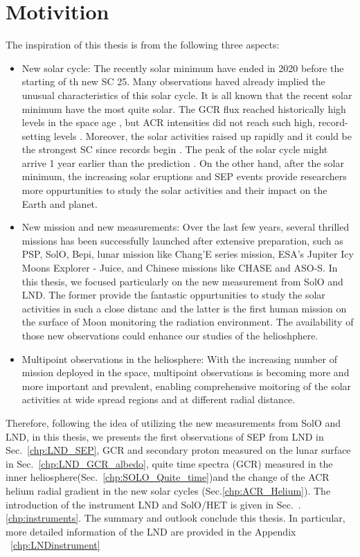 \section{Motivition}

The inspiration of this thesis is from the following three aspects:
\begin{itemize}
	\item New solar cycle: The recently solar minimum have ended in 2020 before the starting of th new \ac{SC} 25. Many observations haved already implied the unusual characteristics of this solar cycle. It is all known that the recent solar minimum have the most quite solar. The \ac{GCR} flux reached historically high levels in the space age \citep{Fu2021ApJS, Xu2022FrASS}, but ACR intensities did not reach such high, record-setting levels \citet{Strauss2023ApJ}. Moreover, the solar activities raised up rapidly and it could be the strongest \ac{SC} since records begin \citet{Nagovitsyn2023SoPh}. The peak of the solar cycle might arrive 1 year earlier than the prediction \citet{McIntosh2020SoPh}. On the other hand, after the solar minimum, the increasing solar eruptions and \ac{SEP} events provide researchers more oppurtunities to study the solar activities and their impact on the Earth and planet.
	\item New mission and new measurements: Over the last few years, several thrilled missions has been successfully launched after extensive preparation, such as \ac{PSP}, \ac{SolO}, \ac{Bepi}, lunar mission like Chang'E series mission, ESA's Jupiter Icy Moons Explorer - Juice, and Chinese missions like CHASE and ASO-S. In this thesis, we focused particularly on the new measurement from \ac{SolO} and \ac{LND}. The former provide the fantastic oppurtunities to study the solar activities in such a close distanc and the latter is the first human mission on the surface of Moon monitoring the radiation environment. The availability of those new observations could enhance our studies of the helioshphere.
	\item Multipoint observations in the heliosphere: With the increasing number of mission deployed in the space, multipoint observations is becoming more and more important and prevalent, enabling comprehensive moitoring of the solar activities at wide spread regions and at different radial distance. 
	
\end{itemize}

Therefore, following the idea of utilizing the new measurements from \ac{SolO} and \ac{LND}, in this thesis, we presents the first  observations of \ac{SEP} from \ac{LND} in Sec.~\ref{chp:LND_SEP}, \ac{GCR} and secondary proton measured on the lunar surface in Sec.~\ref{chp:LND_GCR_albedo}, quite time spectra (\ac{GCR}) measured in the inner heliosphere(Sec.~\ref{chp:SOLO_Quite_time})and the change of the \ac{ACR} helium radial gradient in the new solar cycles (Sec.\ref{chp:ACR_Helium}).
The introduction of the instrument \ac{LND} and \ac{SolO}/\ac{HET} is given in Sec.~.\ref{chp:instruments}. The summary and outlook conclude this thesis. In particular, more detailed information of the \ac{LND} are provided in the Appendix ~\ref{chp:LNDinstrument}

